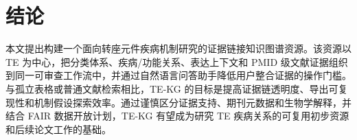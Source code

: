 \documentclass[12pt,a4paper,UTF8]{ctexart}
\begin{document}
\section{结论}

本文提出构建一个面向转座元件疾病机制研究的证据链接知识图谱资源。该资源以 TE 为中心，把分类体系、疾病/功能关系、表达上下文和 PMID 级文献证据组织到同一可审查工作流中，并通过自然语言问答助手降低用户整合证据的操作门槛。与孤立表格或普通文献检索相比，TE-KG 的目标是提高证据链透明度、导出可复现性和机制假设探索效率。通过谨慎区分证据支持、期刊元数据和生物学解释，并结合 FAIR 数据开放计划，TE-KG 有望成为研究 TE 疾病关系的可复用初步资源和后续论文工作的基础。

\end{document}

